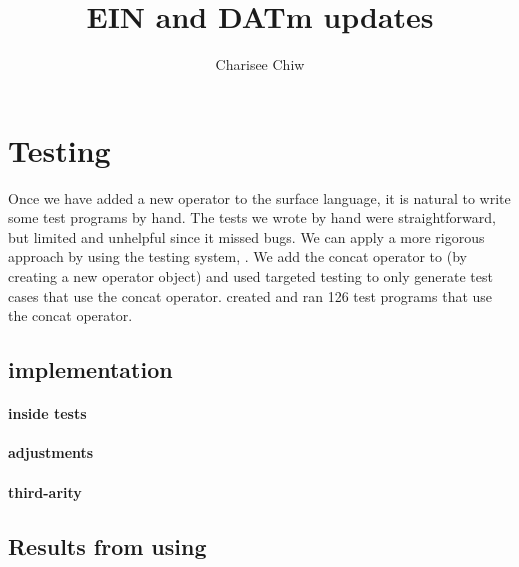 \documentclass{article}
\title{EIN and DATm updates}
\author{Charisee Chiw}
\begin{document}
\maketitle 

\section{Testing}
Once we have added a new operator to the surface language, it is natural to write some test programs by hand. 
The tests we wrote by hand were straightforward, but limited and unhelpful since it missed bugs.
We can apply a more rigorous approach  by using the testing system, 
\checkname{}.
We add the concat operator to \checkname{} (by creating a new operator object)
and used targeted testing to only generate test cases that use the concat operator.
\checkname{} created and ran 126 test programs that use the concat operator.




 \subsection{\checkname{} implementation}
\paragraph{ inside tests}
\paragraph{adjustments}
 \paragraph{ third-arity}
\subsection{Results from using \checkname{}}
\end{document}
